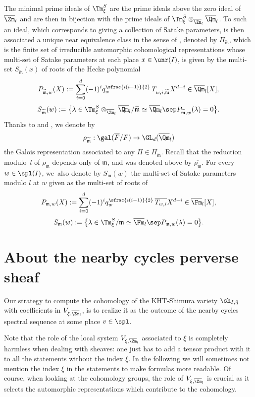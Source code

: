 The minimal prime ideals of $\Tm^S_{\xi}$ are the prime ideals above the zero ideal of
$\overline \Zm_l$ and are then in bijection with the prime ideals of
$\Tm^S_{\xi} \otimes_{\overline \Zm_l} \overline \Qm_l$.
To such an ideal, which corresponds
to giving a collection of Satake parameters, is then associated a unique near equivalence class in
the sense of \cite{y-t}, denoted by $\Pi_{\widetilde{\mathfrak m}}$, which is the finite set of
irreducible automorphic cohomological representations whose multi-set of Satake parameters
at each place $x \in \unr(I)$, is given by the multi-set $S_{\widetilde{\mathfrak m}}(x)$ of roots of
the Hecke polynomial
\[
P_{\widetilde{\mathfrak{m}},w}(X):=\sum_{i=0}^d(-1)^i q_w^{\sfrac{i(i-1)}{2}}\,
T_{w,i,\widetilde{\mathfrak m}} X^{d-i} \in \overline \Qm_l[X],
\]
\ie\[
S_{\widetilde{\mathfrak{m}}}(w) := \bigl \{\lambda \in \Tm^S_{\xi} \otimes_{\overline \Zm_l}
\overline \Qm_l / \widetilde{\mathfrak m} \simeq \overline \Qm_l \sep
P_{\widetilde{\mathfrak{m}},w}(\lambda)=0 \bigr\}.
\]
Thanks to \cite{h-t} and \cite{y-t}, we denote by
\[
\rho_{\widetilde{\mathfrak m}}:\gal(\overline F/F) \to \GL_d(\overline \Qm_l)
\]
the Galois representation associated to any $\Pi \in \Pi_{\widetilde{\mathfrak m}}$.
Recall that the reduction modulo~$l$ of $\rho_{\widetilde{\mathfrak m}}$ depends only
of $\mathfrak m$, and was denoted above by $\overline{\rho_{\mathfrak m}}$.
For every $w \in \spl(I)$, we~also denote by $S_{\mathfrak{m}}(w)$ the multi-set of Satake parameters modulo $l$ at $w$ given as the multi-set of roots of
\[
P_{\mathfrak{m},w}(X):=\sum_{i=0}^d(-1)^i q_w^{\sfrac{i(i-1)}{2}}\, \overline{T_{w,i}} X^{d-i}
\in \overline \Fm_l[X],
\]
\ie\[
S_{\mathfrak{m}}(w) := \bigl \{\lambda \in \Tm^S_\xi/\mathfrak m \simeq \overline \Fm_l
\sep P_{\mathfrak{m},w}(\lambda)=0 \bigr\}.
\]

\section{About the nearby cycles perverse sheaf}

Our strategy to compute the cohomology of the KHT-Shimura variety $\sh_{I,\bar \eta}$ with
coefficients in $V_{\xi,\overline \Zm_l}$, is to realize it as the outcome of the nearby cycles
spectral sequence at some place $v \in \spl$.

Note that the role of the local system $V_{\xi,\overline \Zm_l}$
associated to $\xi$ is completely harmless when
dealing with sheaves: one just has to add a tensor product with it to all the
statements without the index $\xi$. In the following we will sometimes not mention the index
$\xi$ in the statements to make formulas more readable. Of course, when looking at the
cohomology groups, the role of $V_{\xi,\overline \Zm_l}$ is crucial as it selects the
automorphic representations which contribute to the cohomology.

